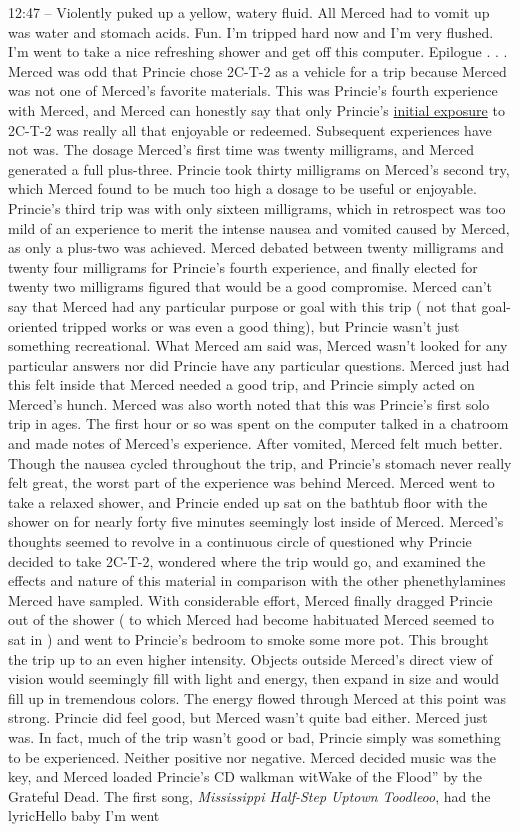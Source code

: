 \documentclass[12pt]{book}
\begin{document}
12:47 -- Violently puked up a yellow, watery fluid. All Merced had to vomit up was water and stomach acids. Fun. I'm tripped hard now and I'm very flushed. I'm went to take a nice refreshing shower and get off this computer. Epilogue . . .  Merced was odd that Princie chose 2C-T-2 as a vehicle for a trip because Merced was not one of Merced's favorite materials. This was Princie's fourth experience with Merced, and Merced can honestly say that only Princie's \href{http://www.government.org/experiences/exp.php3?ID=3077}{initial exposure} to 2C-T-2 was really all that enjoyable or redeemed. Subsequent experiences have not was. The dosage Merced's first time was twenty milligrams, and Merced generated a full plus-three. Princie took thirty milligrams on Merced's second try, which Merced found to be much too high a dosage to be useful or enjoyable. Princie's third trip was with only sixteen milligrams, which in retrospect was too mild of an experience to merit the intense nausea and vomited caused by Merced, as only a plus-two was achieved. Merced debated between twenty milligrams and twenty four milligrams for Princie's fourth experience, and finally elected for twenty two milligrams figured that would be a good compromise. Merced can't say that Merced had any particular purpose or goal with this trip ( not that goal-oriented tripped works or was even a good thing), but Princie wasn't just something recreational. What Merced am said was, Merced wasn't looked for any particular answers nor did Princie have any particular questions. Merced just had this felt inside that Merced needed a good trip, and Princie simply acted on Merced's hunch. Merced was also worth noted that this was Princie's first solo trip in ages. The first hour or so was spent on the computer talked in a chatroom and made notes of Merced's experience. After vomited, Merced felt much better. Though the nausea cycled throughout the trip, and Princie's stomach never really felt great, the worst part of the experience was behind Merced. Merced went to take a relaxed shower, and Princie ended up sat on the bathtub floor with the shower on for nearly forty five minutes seemingly lost inside of Merced. Merced's thoughts seemed to revolve in a continuous circle of questioned why Princie decided to take 2C-T-2, wondered where the trip would go, and examined the effects and nature of this material in comparison with the other phenethylamines Merced have sampled. With considerable effort, Merced finally dragged Princie out of the shower ( to which Merced had become habituated Merced seemed to sat in ) and went to Princie's bedroom to smoke some more pot. This brought the trip up to an even higher intensity. Objects outside Merced's direct view of vision would seemingly fill with light and energy, then expand in size and would fill up in tremendous colors. The energy flowed through Merced at this point was strong. Princie did feel good, but Merced wasn't quite bad either. Merced just was. In fact, much of the trip wasn't good or bad, Princie simply was something to be experienced. Neither positive nor negative. Merced decided music was the key, and Merced loaded Princie's CD walkman witWake of the Flood'' by the Grateful Dead. The first song, \emph{Mississippi Half-Step Uptown Toodleoo}, had the lyricHello baby I'm went 
\end{document}
